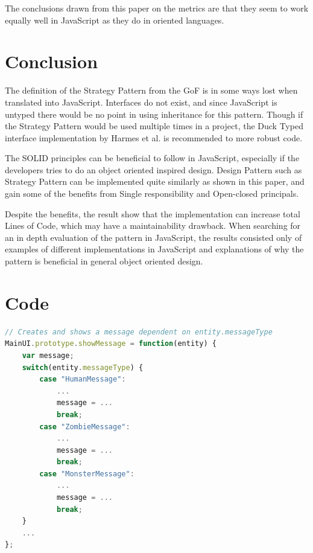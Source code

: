 \documentclass[conference, a4paper]{IEEEtran}
\begin{document}
The conclusions drawn from this paper on the metrics are that they seem to work equally well in JavaScript as they do in oriented languages.

\section{Conclusion}
The definition of the Strategy Pattern from the GoF is in some ways lost when translated into JavaScript. Interfaces do not exist, and since JavaScript is untyped there would be no point in using inheritance for this pattern. Though if the Strategy Pattern would be used multiple times in a project, the Duck Typed interface implementation by Harmes et al. is recommended to more robust code.~\cite{bibitem:DiazHarmes}

The SOLID principles can be beneficial to follow in JavaScript, especially if the developers tries to do an object oriented inspired design. Design Pattern such as Strategy Pattern can be implemented quite similarly as shown in this paper, and gain some of the benefits from Single responsibility and Open-closed principals.

Despite the benefits, the result show that the implementation can increase total Lines of Code, which may have a maintainability drawback. When searching for an in depth evaluation of the pattern in JavaScript, the results consisted only of examples of different implementations in JavaScript and explanations of why the pattern is beneficial in general object oriented design.

\clearpage
\section*{Code}

\begin{lstlisting}[language=JavaScript, label=lst:switch-case, caption=\texttt{MainUI.js} The original switch statement.]
// Creates and shows a message dependent on entity.messageType
MainUI.prototype.showMessage = function(entity) {
	var message;
	switch(entity.messageType) {
		case "HumanMessage":
			...
			message = ...
			break;
		case "ZombieMessage":
			...
			message = ...
			break;
		case "MonsterMessage":
			...
			message = ...
			break;
	}
	...
};
\end{lstlisting}
\end{document}
